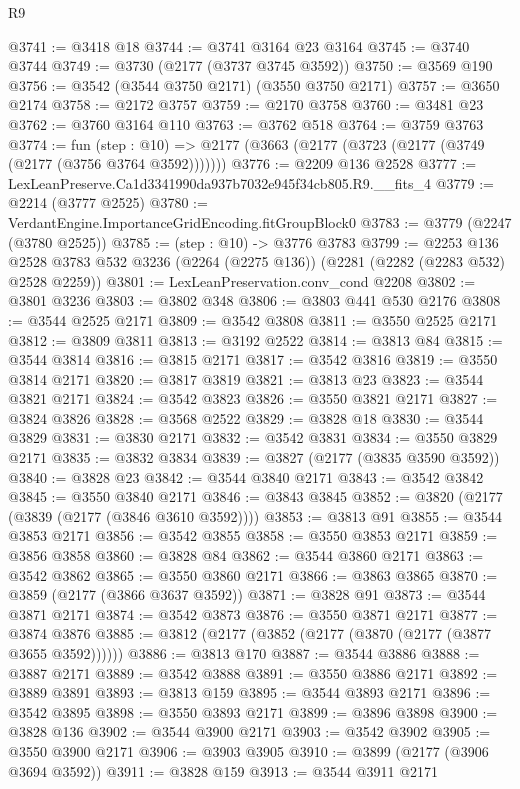 \begin{lexlean}{R9}
\begin{coremodule}
@3741 := @3418 @18
@3744 := @3741 @3164 @23 @3164
@3745 := @3740 @3744
@3749 := @3730 (@2177 (@3737 @3745 @3592))
@3750 := @3569 @190
@3756 := @3542 (@3544 @3750 @2171) (@3550 @3750 @2171)
@3757 := @3650 @2174
@3758 := @2172 @3757
@3759 := @2170 @3758
@3760 := @3481 @23
@3762 := @3760 @3164 @110
@3763 := @3762 @518
@3764 := @3759 @3763
@3774 := fun (step : @10) =>
  @2177 (@3663 (@2177 (@3723 (@2177 (@3749 (@2177 (@3756 @3764 @3592)))))))
@3776 := @2209 @136 @2528
@3777 := LexLeanPreserve.Ca1d3341990da937b7032e945f34cb805.R9.__fits_4
@3779 := @2214 (@3777 @2525)
@3780 := VerdantEngine.ImportanceGridEncoding.fitGroupBlock0
@3783 := @3779 (@2247 (@3780 @2525))
@3785 := (step : @10) -> @3776 @3783
@3799 := @2253
    @136
    @2528
    @3783
    @532
    @3236
    (@2264 (@2275 @136))
    (@2281 (@2282 (@2283 @532) @2528 @2259))
@3801 := LexLeanPreservation.conv_cond @2208
@3802 := @3801 @3236
@3803 := @3802 @348
@3806 := @3803 @441 @530 @2176
@3808 := @3544 @2525 @2171
@3809 := @3542 @3808
@3811 := @3550 @2525 @2171
@3812 := @3809 @3811
@3813 := @3192 @2522
@3814 := @3813 @84
@3815 := @3544 @3814
@3816 := @3815 @2171
@3817 := @3542 @3816
@3819 := @3550 @3814 @2171
@3820 := @3817 @3819
@3821 := @3813 @23
@3823 := @3544 @3821 @2171
@3824 := @3542 @3823
@3826 := @3550 @3821 @2171
@3827 := @3824 @3826
@3828 := @3568 @2522
@3829 := @3828 @18
@3830 := @3544 @3829
@3831 := @3830 @2171
@3832 := @3542 @3831
@3834 := @3550 @3829 @2171
@3835 := @3832 @3834
@3839 := @3827 (@2177 (@3835 @3590 @3592))
@3840 := @3828 @23
@3842 := @3544 @3840 @2171
@3843 := @3542 @3842
@3845 := @3550 @3840 @2171
@3846 := @3843 @3845
@3852 := @3820 (@2177 (@3839 (@2177 (@3846 @3610 @3592))))
@3853 := @3813 @91
@3855 := @3544 @3853 @2171
@3856 := @3542 @3855
@3858 := @3550 @3853 @2171
@3859 := @3856 @3858
@3860 := @3828 @84
@3862 := @3544 @3860 @2171
@3863 := @3542 @3862
@3865 := @3550 @3860 @2171
@3866 := @3863 @3865
@3870 := @3859 (@2177 (@3866 @3637 @3592))
@3871 := @3828 @91
@3873 := @3544 @3871 @2171
@3874 := @3542 @3873
@3876 := @3550 @3871 @2171
@3877 := @3874 @3876
@3885 := @3812 (@2177 (@3852 (@2177 (@3870 (@2177 (@3877 @3655 @3592))))))
@3886 := @3813 @170
@3887 := @3544 @3886
@3888 := @3887 @2171
@3889 := @3542 @3888
@3891 := @3550 @3886 @2171
@3892 := @3889 @3891
@3893 := @3813 @159
@3895 := @3544 @3893 @2171
@3896 := @3542 @3895
@3898 := @3550 @3893 @2171
@3899 := @3896 @3898
@3900 := @3828 @136
@3902 := @3544 @3900 @2171
@3903 := @3542 @3902
@3905 := @3550 @3900 @2171
@3906 := @3903 @3905
@3910 := @3899 (@2177 (@3906 @3694 @3592))
@3911 := @3828 @159
@3913 := @3544 @3911 @2171

\end{coremodule}
\end{lexlean}
